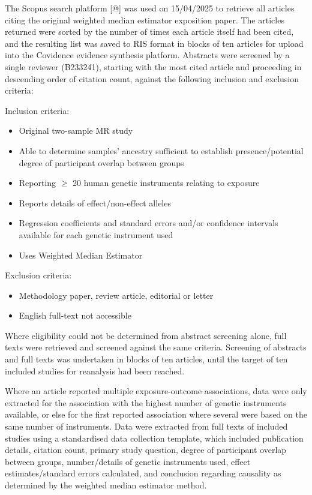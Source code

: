 \documentclass[
]{article}
\begin{document}
The Scopus search platform {[}@{]} was used on 15/04/2025 to retrieve all articles citing the original weighted median estimator exposition paper\textsuperscript{}. The articles returned were sorted by the number of times each article itself had been cited, and the resulting list was saved to RIS format in blocks of ten articles for upload into the Covidence evidence synthesis platform. Abstracts were screened by a single reviewer (B233241), starting with the most cited article and proceeding in descending order of citation count, against the following inclusion and exclusion criteria:

Inclusion criteria:

\begin{itemize}
\item
  Original two-sample MR study
\item
  Able to determine samples' ancestry sufficient to establish presence/potential degree of participant overlap between groups
\item
  Reporting \(\ge\) 20 human genetic instruments relating to exposure
\item
  Reports details of effect/non-effect alleles
\item
  Regression coefficients and standard errors and/or confidence intervals available for each genetic instrument used
\item
  Uses Weighted Median Estimator
\end{itemize}

Exclusion criteria:

\begin{itemize}
\item
  Methodology paper, review article, editorial or letter
\item
  English full-text not accessible
\end{itemize}

Where eligibility could not be determined from abstract screening alone, full texts were retrieved and screened against the same criteria. Screening of abstracts and full texts was undertaken in blocks of ten articles, until the target of ten included studies for reanalysis had been reached.

Where an article reported multiple exposure-outcome associations, data were only extracted for the association with the highest number of genetic instruments available, or else for the first reported association where several were based on the same number of instruments. Data were extracted from full texts of included studies using a standardised data collection template, which included publication details, citation count, primary study question, degree of participant overlap between groups, number/details of genetic instruments used, effect estimates/standard errors calculated, and conclusion regarding causality as determined by the weighted median estimator method.
\end{document}
